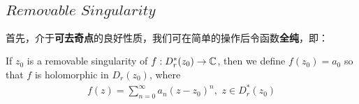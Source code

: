 \subsection{$Removable \,\, Singularity$}
	首先，介于\textbf{可去奇点}的良好性质，我们可在简单的操作后令函数\textbf{全纯}，即：
	\begin{rmk}
		If $z_0$ is a removable singularity of $f : D_{r}^{*}(z_0) \rightarrow \mathbb{C}$, then we define $f(z_0) = a_0$ so that $f$ is holomorphic in $D_{r}(z_0)$, where
		\begin{align}
			f(z) = \sum_{n = 0}^{\infty}{a_n (z - z_0)^n} , \,\, z \in D_{r}^{*}(z_0)
		\end{align}
	\end{rmk}
	
	\vspace{2em}

